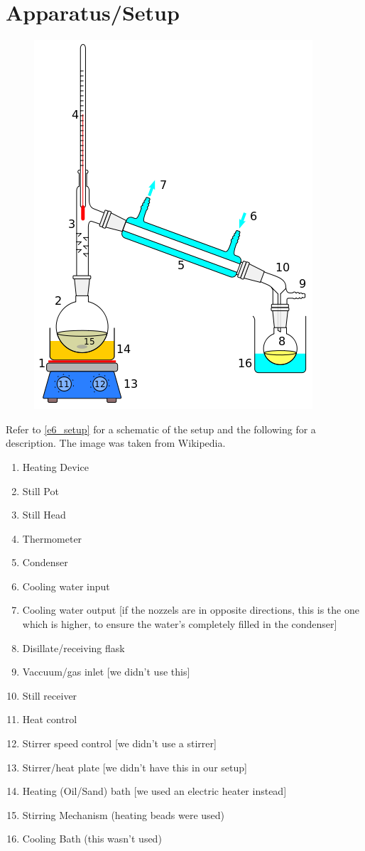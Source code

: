 \section {Apparatus/Setup}
	\begin{figure}[bth]
		\begin{center}
			\includegraphics[width=0.7\linewidth]{gfx/e6_setup}
		\end{center}
	\caption[Distillation Setup]{\label{e6_setup}}
	\end{figure}
	Refer to \autoref{e6_setup} for a schematic of the setup and the following for a description. The image was taken from Wikipedia.
	\begin{enumerate}
		\item Heating Device
		\item Still Pot
		\item Still Head
		\item Thermometer
		\item Condenser
		\item Cooling water input		
		\item Cooling water output [if the nozzels are in opposite directions, this is the one which is higher, to ensure the water's completely filled in the condenser]
		\item Disillate/receiving flask
		\item Vaccuum/gas inlet [we didn't use this]
		\item Still receiver
		\item Heat control
		\item Stirrer speed control [we didn't use a stirrer]
		\item Stirrer/heat plate [we didn't have this in our setup]
		\item Heating (Oil/Sand) bath [we used an electric heater instead]
		\item Stirring Mechanism (heating beads were used)
		\item Cooling Bath (this wasn't used)
	\end{enumerate}


